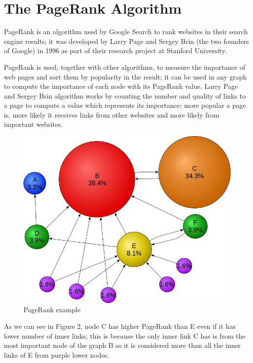 \documentclass[12 pt]{article}
\begin{document}
\section{The PageRank Algorithm}
PageRank is an algorithm used by Google Search to rank websites in their search engine results; it was developed by  Larry Page and  Sergey Brin (the two founders of Google) in 1996 as part of their research project at Stanford University.

PageRank is used, together with other algorithms, to measure the importance of web pages and sort them by popularity in the result; it can be used in any graph to compute the importance of each node with its PageRank value. Larry Page and  Sergey Brin algorithm works by counting the number and quality of links to a page to compute a value which represents its importance; more popular a page is, more likely it receives links from other websites and more likely from important websites.

\begin{figure}[h!]
\begin{center}
\includegraphics[scale=0.3]{./img/page_rank_example.png}
\caption{PageRank example}
\end{center}
\end{figure}
As we can see in Figure 2, node C has higher PageRank than E even if it has lower number of inner links; this is because the only inner link C has is from the most important node of the graph B so it is considered more than all the inner links of E from purple lower nodes.
\end{document}
